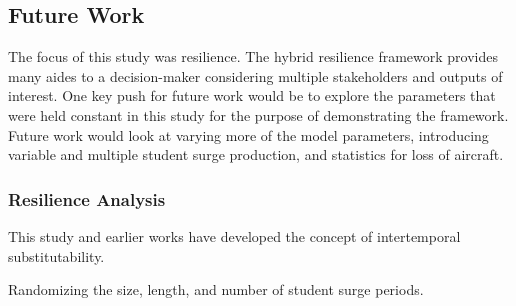 \subsection{Future Work}

The focus of this study was resilience. The hybrid resilience
framework provides many aides to a decision-maker considering multiple
stakeholders and outputs of interest.
One key push for future work would be to explore the parameters that
were held constant in this study for the purpose of demonstrating the
framework. Future work would look at varying more of the model parameters,
introducing variable and multiple student surge production, and
statistics for loss of aircraft. 

\subsubsection{Resilience Analysis}
This study and earlier works have developed the concept of
intertemporal substitutability. 

Randomizing the size, length, and number of student surge periods. 




\clearpage











